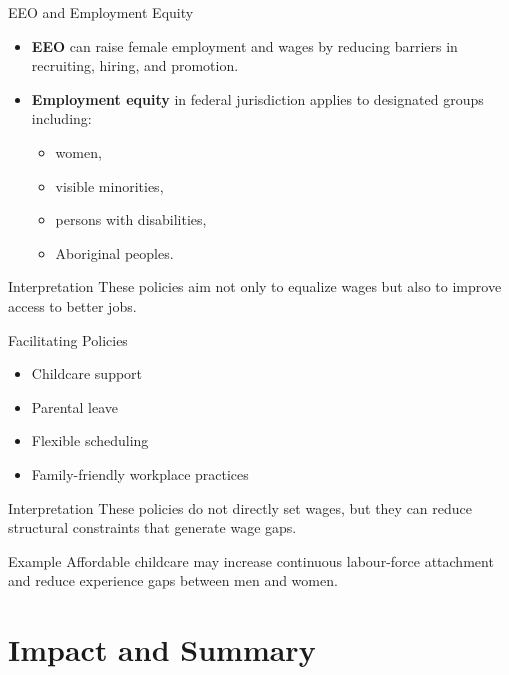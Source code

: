 \documentclass[aspectratio=169]{beamer}
\begin{document}
\begin{frame}{EEO and Employment Equity}
\transfade
\begin{itemize}
  \item \textbf{EEO} can raise female employment and wages by reducing barriers in recruiting, hiring, and promotion.
  \item \textbf{Employment equity} in federal jurisdiction applies to designated groups including:
  \begin{itemize}
    \item women,
    \item visible minorities,
    \item persons with disabilities,
    \item Aboriginal peoples.
  \end{itemize}
\end{itemize}

\begin{block}{Interpretation}
These policies aim not only to equalize wages but also to improve access to better jobs.
\end{block}
\end{frame}

\begin{frame}{Facilitating Policies}
\transfade
\begin{itemize}
  \item Childcare support
  \item Parental leave
  \item Flexible scheduling
  \item Family-friendly workplace practices
\end{itemize}

\begin{block}{Interpretation}
These policies do not directly set wages, but they can reduce structural constraints that generate wage gaps.
\end{block}

\begin{exampleblock}{Example}
Affordable childcare may increase continuous labour-force attachment and reduce experience gaps between men and women.
\end{exampleblock}
\end{frame}

\section{Impact and Summary}
\end{document}
